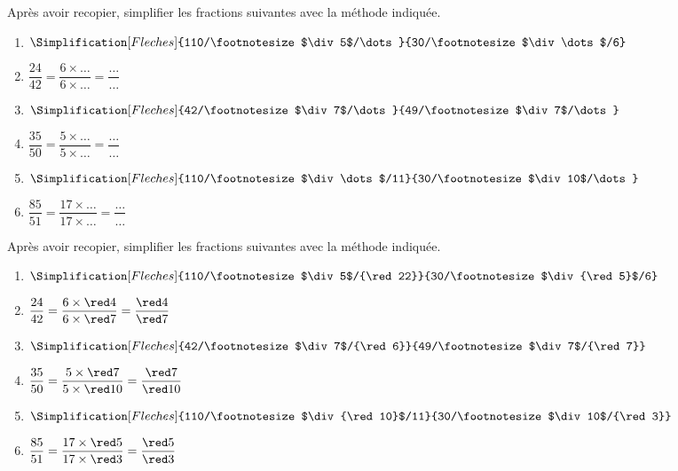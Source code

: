 \begin{exercice*}
    Après avoir recopier, simplifier les fractions suivantes avec la méthode indiquée.
    \begin{spacing}{3}
        \begin{multicols}{2}
            \begin{enumerate}                
                \item $\displaystyle\Simplification[Fleches]{110/\footnotesize$\div5$/\dots}{30/\footnotesize$\div\dots$/6}$
                \item $\dfrac{24}{42}=\dfrac{6\times\dots}{6\times\dots}=\dfrac{\dots}{\dots}$
                \item $\displaystyle\Simplification[Fleches]{42/\footnotesize$\div7$/\dots}{49/\footnotesize$\div7$/\dots}$
                \item $\dfrac{35}{50}=\dfrac{5\times\dots}{5\times\dots}=\dfrac{\dots}{\dots}$
                \item $\displaystyle\Simplification[Fleches]{110/\footnotesize$\div\dots$/11}{30/\footnotesize$\div10$/\dots}$
                \item $\dfrac{85}{51}=\dfrac{17\times\dots}{17\times\dots}=\dfrac{\dots}{\dots}$
            \end{enumerate}
        \end{multicols}
    \end{spacing}
\end{exercice*}
\begin{corrige}
    Après avoir recopier, simplifier les fractions suivantes avec la méthode indiquée.
    \begin{spacing}{3}
        \begin{multicols}{2}
            \begin{enumerate}                
                \item $\displaystyle\Simplification[Fleches]{110/\footnotesize$\div5$/{\red 22}}{30/\footnotesize$\div{\red 5}$/6}$
                \item $\dfrac{24}{42}=\dfrac{6\times{\red 4}}{6\times{\red 7}}=\dfrac{{\red 4}}{{\red 7}}$
                \item $\displaystyle\Simplification[Fleches]{42/\footnotesize$\div7$/{\red 6}}{49/\footnotesize$\div7$/{\red 7}}$
                \item $\dfrac{35}{50}=\dfrac{5\times{\red 7}}{5\times{\red 10}}=\dfrac{{\red 7}}{{\red 10}}$
                \item $\displaystyle\Simplification[Fleches]{110/\footnotesize$\div{\red 10}$/11}{30/\footnotesize$\div10$/{\red 3}}$
                \item $\dfrac{85}{51}=\dfrac{17\times{\red 5}}{17\times{\red 3}}=\dfrac{{\red 5}}{{\red 3}}$
            \end{enumerate}
        \end{multicols}
    \end{spacing}

\end{corrige}

